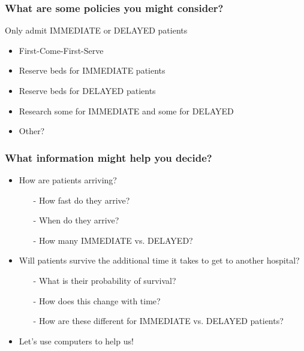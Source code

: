 \documentclass{beamer}
\begin{document}
\begin{frame}
  \frametitle{What are some policies you might consider?}
  \pause
  Only admit IMMEDIATE or DELAYED patients
  \pause
  \begin{itemize}
    \item First-Come-First-Serve
    \item Reserve beds for IMMEDIATE patients
    \item Reserve beds for DELAYED patients
    \item Research some for IMMEDIATE and some for DELAYED
    \item Other?
  \end{itemize}
\end{frame}

\begin{frame}
  \frametitle{What information might help you decide?}
  \pause
  \begin{itemize}
    \item How are patients arriving?
    \begin{itemize}
      \item[-] How fast do they arrive?
      \item[-] When do they arrive?
      \item[-] How many IMMEDIATE vs. DELAYED?
    \end{itemize}
  \end{itemize}
  \pause
  \begin{itemize}
    \item Will patients survive the additional time it takes to get to another hospital?
    \begin{itemize}
      \item[-] What is their probability of survival?
      \item[-] How does this change with time?
      \item[-] How are these different for IMMEDIATE vs. DELAYED patients?
    \end{itemize}
    \pause
    \item Let's use computers to help us!
  \end{itemize}
\end{frame}
\end{document}
